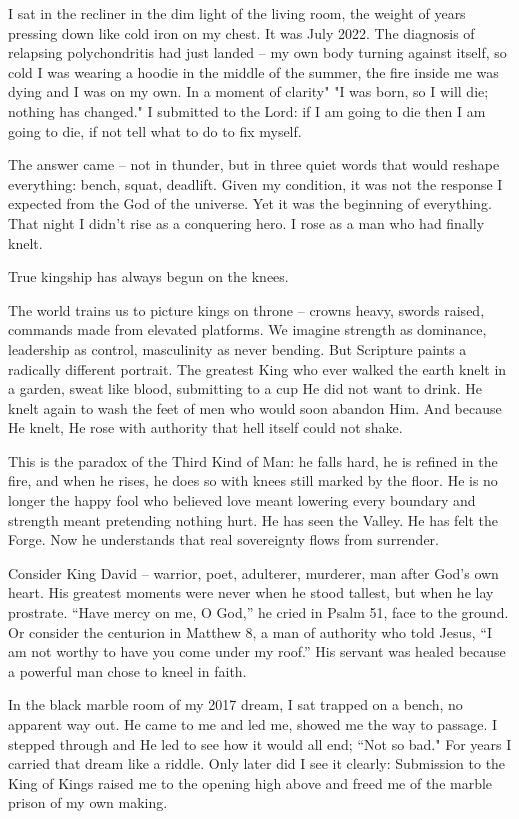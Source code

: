 \documentclass[12pt,a4paper]{book}
\begin{document}
I sat in the recliner in the dim light of the living room, the weight of years pressing down like cold iron on my chest. It was July 2022. The diagnosis of relapsing polychondritis had just landed -- my own body turning against itself, so cold I was wearing a hoodie in the middle of the summer, the fire inside me was dying and I was on my own.  In a moment of clarity" "I was born, so I will die; nothing has changed."  I submitted to the Lord: if I am going to die then I am going to die,  if not tell what to do to fix myself.

The answer came -- not in thunder,  but in three quiet words that would reshape everything: bench,  squat,  deadlift.   Given my condition, it was not the response I expected from the God of the universe.   Yet it was the beginning of everything.   That night I didn’t rise as a conquering hero. I rose as a man who had finally knelt.

True kingship has always begun on the knees.

The world trains us to picture kings on throne -- crowns heavy,  swords raised,  commands made from elevated platforms. We imagine strength as dominance, leadership as control, masculinity as never bending. But Scripture paints a radically different portrait. The greatest King who ever walked the earth knelt in a garden, sweat like blood, submitting to a cup He did not want to drink. He knelt again to wash the feet of men who would soon abandon Him. And because He knelt, He rose with authority that hell itself could not shake.

This is the paradox of the Third Kind of Man: he falls hard, he is refined in the fire, and when he rises, he does so with knees still marked by the floor. He is no longer the happy fool who believed love meant lowering every boundary and strength meant pretending nothing hurt. He has seen the Valley. He has felt the Forge. Now he understands that real sovereignty flows from surrender.

Consider King David -- warrior,  poet,  adulterer,  murderer,  man after God’s own heart.   His greatest moments were never when he stood tallest,  but when he lay prostrate.   “Have mercy on me,  O God,” he cried in Psalm 51,  face to the ground.   Or consider the centurion in Matthew 8,  a man of authority who told Jesus,  “I am not worthy to have you come under my roof.”  His servant was healed because a powerful man chose to kneel in faith.

In the black marble room of my 2017 dream,  I sat trapped on a bench,  no apparent way out.   He came to me and led me, showed me the way to passage.  I stepped through and He led to see how it would all end; “Not so bad."  For years I carried that dream like a riddle.   Only later did I see it clearly:  Submission to the King of Kings raised me to the opening high above and freed me of the marble prison of my own making.
\end{document}
